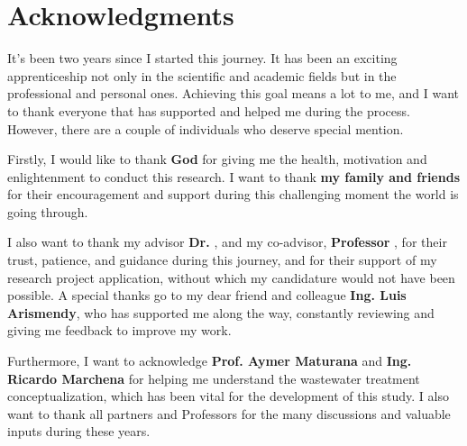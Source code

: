 \chapter*{Acknowledgments}

It’s been two years since I started this journey. It has been an exciting apprenticeship not only in the scientific and academic fields but in the professional and personal ones. Achieving this goal means a lot to me, and I want to thank everyone that has supported and helped me during the process. However, there are a couple of individuals who deserve special mention.

Firstly, I would like to thank \textbf{God} for giving me the health, motivation and enlightenment to conduct this research. I want to thank \textbf{my family and friends} for their encouragement and support during this challenging moment the world is going through.

I also want to thank my advisor \textbf{Dr.} \textbf{\myProfFirstName} \textbf{\myProfLastName}, and my co-advisor, \textbf{Professor} \textbf{\myOtherProfFirstName} \textbf{\myOtherProfLastName}, for their trust, patience, and guidance during this journey, and for their support of my research project application, without which my candidature would not have been possible. A special thanks go to my dear friend and colleague \textbf{Ing. Luis Arismendy}, who has supported me along the way, constantly reviewing and giving me feedback to improve my work.

Furthermore, I want to acknowledge \textbf{Prof. Aymer Maturana} and \textbf{Ing. Ricardo Marchena} for helping me understand the wastewater treatment conceptualization, which has been vital for the development of this study. I also want to thank all partners and Professors for the many discussions and valuable inputs during these years. 




